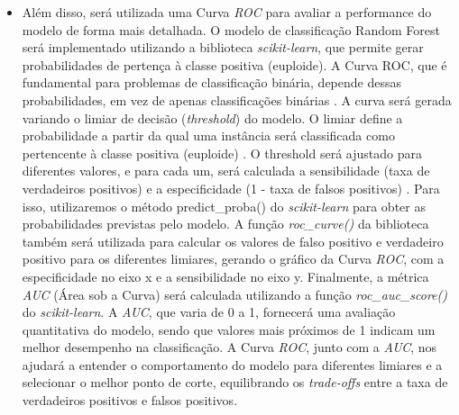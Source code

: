 \begin{itemize}
\begin{itemize}
\begin{itemize}
\begin{itemize}
\begin{itemize}
\begin{itemize}
          \item Além disso, será utilizada uma Curva \textit{ROC} para avaliar a performance do modelo de forma mais detalhada. O modelo de classificação Random Forest será implementado utilizando a biblioteca \textit{scikit-learn}, que permite gerar probabilidades de pertença à classe positiva (euploide). A Curva ROC, que é fundamental para problemas de classificação binária, depende dessas probabilidades, em vez de apenas classificações binárias \cite{vilela2022}. A curva será gerada variando o limiar de decisão (\textit{threshold}) do modelo. O limiar define a probabilidade a partir da qual uma instância será classificada como pertencente à classe positiva (euploide) \cite{vilela2022}. O threshold será ajustado para diferentes valores, e para cada um, será calculada a sensibilidade (taxa de verdadeiros positivos) e a especificidade (1 - taxa de falsos positivos) \cite{vilela2022}. Para isso, utilizaremos o método predict_proba() do \textit{scikit-learn} para obter as probabilidades previstas pelo modelo. A função \textit{roc_curve()} da biblioteca também será utilizada para calcular os valores de falso positivo e verdadeiro positivo para os diferentes limiares, gerando o gráfico da Curva \textit{ROC}, com a especificidade no eixo x e a sensibilidade no eixo y. Finalmente, a métrica \textit{AUC} (Área sob a Curva) será calculada utilizando a função \textit{roc_auc_score()} do \textit{scikit-learn}. A \textit{AUC}, que varia de 0 a 1, fornecerá uma avaliação quantitativa do modelo, sendo que valores mais próximos de 1 indicam um melhor desempenho na classificação. A Curva \textit{ROC}, junto com a \textit{AUC}, nos ajudará a entender o comportamento do modelo para diferentes limiares e a selecionar o melhor ponto de corte, equilibrando os \textit{trade-offs} entre a taxa de verdadeiros positivos e falsos positivos.
        \end{itemize}


\end{itemize}
\end{itemize}
\end{itemize}
\end{itemize}
\end{itemize}
